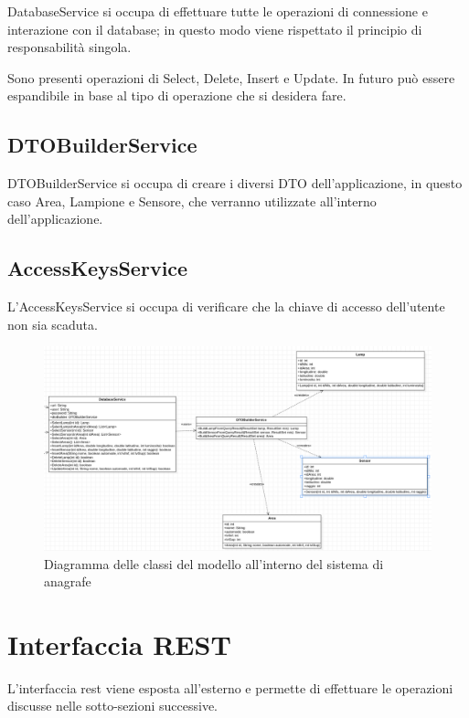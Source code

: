 DatabaseService si occupa di effettuare tutte le operazioni di connessione e interazione con il database; in questo modo viene rispettato il principio di responsabilità singola.

Sono presenti operazioni di Select, Delete, Insert e Update. In futuro può essere espandibile in base al tipo di operazione che si desidera fare.

\subsection{DTOBuilderService}
DTOBuilderService si occupa di creare i diversi DTO dell'applicazione, in questo caso Area, Lampione e Sensore, che verranno utilizzate all'interno dell'applicazione.

\subsection{AccessKeysService}
L'AccessKeysService si occupa di verificare che la chiave di accesso dell'utente non sia scaduta.

\begin{figure}[h]
    \centering
    \includegraphics[width=\textwidth]{img/model_anagrafe.png}
    \caption{Diagramma delle classi del modello all'interno del sistema di anagrafe}
    \label{fig:model_anagrafe}
\end{figure}

\section{Interfaccia REST}

L'interfaccia rest viene esposta all'esterno e permette di effettuare le operazioni discusse nelle sotto-sezioni successive.

